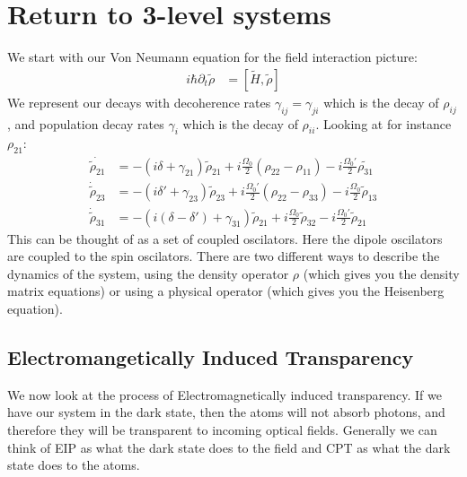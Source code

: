 \section*{Return to 3-level systems}
We start with our Von Neumann equation for the field interaction picture:
\begin{align*}
	i\hbar\partial_t\tilde{\rho} &= [\tilde{H},\tilde{\rho}]
\end{align*}
We represent our decays with decoherence rates $\gamma_{ij} = \gamma_{ji}$ which is the decay of $\rho_{ij}$, and population decay rates $\gamma_i$ which is the decay of $\rho_{ii}$.
Looking at for instance $\rho_{21}$:
\begin{align*}
	\dot{\tilde{\rho}_{21}} &= -(i\delta + \gamma_{21})\tilde{\rho}_{21} + i\frac{\Omega_0}{2}(\rho_{22} - \rho_{11}) - i\frac{\Omega_0'}{2}\tilde{\rho_{31}} \\
	\dot{\tilde{\rho}}_{23} &= -(i\delta' + \gamma_{23})\tilde{\rho}_{23} + i\frac{\Omega_0'}{2}(\rho_{22} - \rho_{33}) - i\frac{\Omega_0}{2}\tilde{\rho}_{13} \\
	\dot{\tilde{\rho}}_{31} &= -(i(\delta-\delta') + \gamma_{31})\tilde{\rho}_{21} + i\frac{\Omega_0}{2} \tilde{\rho}_{32} - i\frac{\Omega_0'}{2}\tilde{\rho}_{21}
\end{align*}
This can be thought of as a set of coupled oscilators. Here the dipole oscilators are coupled to the spin oscilators.
There are two different ways to describe the dynamics of the system, using the density operator $\rho$ (which gives you the density matrix equations) or using a physical operator (which gives you the Heisenberg equation).

\subsection{Electromangetically Induced Transparency}
We now look at the process of Electromagnetically induced transparency. If we have our system in the dark state, then the atoms will not absorb photons, and therefore they will be transparent to incoming optical fields.
Generally we can think of EIP as what the dark state does to the field and CPT as what the dark state does to the atoms.

